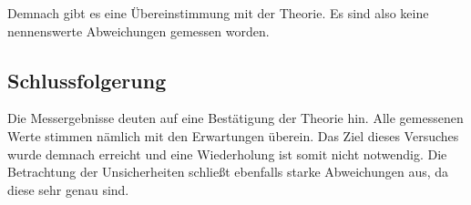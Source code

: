 Demnach gibt es eine Übereinstimmung mit der Theorie. 
Es sind also keine nennenswerte Abweichungen gemessen worden. 

\subsection{Schlussfolgerung}

Die Messergebnisse deuten auf eine Bestätigung der Theorie hin. 
Alle gemessenen Werte stimmen nämlich mit den Erwartungen überein. 
Das Ziel dieses Versuches wurde demnach erreicht und eine Wiederholung ist somit nicht notwendig.
Die Betrachtung der Unsicherheiten schließt ebenfalls starke Abweichungen aus, da diese sehr genau sind.
